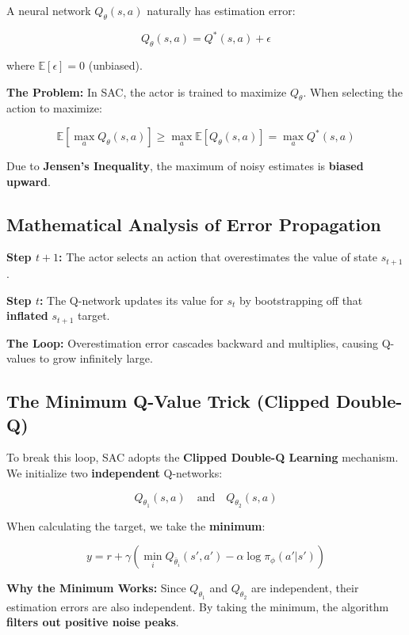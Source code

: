\documentclass[12pt,a4paper]{article}
\theoremstyle{noteplain}
\theoremstyle{noteexercise}
\begin{document}
A neural network $Q_\theta(s,a)$ naturally has estimation error:

$$Q_\theta(s,a) = Q^*(s,a) + \epsilon$$

where $\mathbb{E}[\epsilon] = 0$ (unbiased).

\textbf{The Problem:} In SAC, the actor is trained to maximize $Q_\theta$. When selecting the action to maximize:

$$\mathbb{E}\left[\max_a Q_\theta(s,a)\right] \geq \max_a \mathbb{E}[Q_\theta(s,a)] = \max_a Q^*(s,a)$$

Due to \textbf{Jensen's Inequality}, the maximum of noisy estimates is \textbf{biased upward}.



\subsection{Mathematical Analysis of Error Propagation}\label{ssec:error-propagation}



\textbf{Step $t+1$:} The actor selects an action that overestimates the value of state $s_{t+1}$.

\textbf{Step $t$:} The Q-network updates its value for $s_t$ by bootstrapping off that \textbf{inflated} $s_{t+1}$ target.

\textbf{The Loop:} Overestimation error cascades backward and multiplies, causing Q-values to grow infinitely large.



\subsection{The Minimum Q-Value Trick (Clipped Double-Q)}\label{ssec:min-q}



To break this loop, SAC adopts the \textbf{Clipped Double-Q Learning} mechanism. We initialize two \textbf{independent} Q-networks:

$$Q_{\theta_1}(s,a) \quad \text{and} \quad Q_{\theta_2}(s,a)$$

When calculating the target, we take the \textbf{minimum}:

\begin{equation}\label{eq:min-q}
\boxed{y = r + \gamma \left(\min_i Q_{\bar{\theta}_i}(s', a') - \alpha \log\pi_\phi(a'|s')\right)}
\end{equation}

\textbf{Why the Minimum Works:} Since $Q_{\theta_1}$ and $Q_{\theta_2}$ are independent, their estimation errors are also independent. By taking the minimum, the algorithm \textbf{filters out positive noise peaks}.
\end{document}

